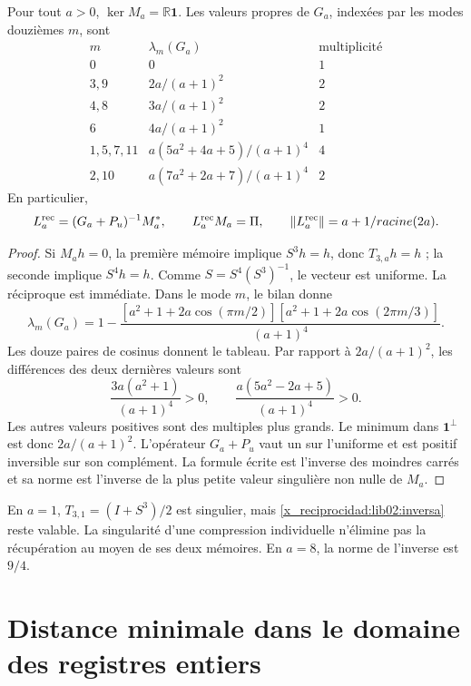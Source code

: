 \begin{theorem}
\label{x_reciprocidad:lib02:inversa-memorias}
Pour tout \(a>0\), \(\ker M_a=\mathbb R\mathbf1\). Les valeurs propres de \(G_a\), indexées par les modes douzièmes \(m\), sont
\[
\begin{array}{c|c|c}
 m&\lambda_m(G_a)&\text{multiplicité}\\\hline
 0&0&1\\
 3,9&2a/(a+1)^2&2\\
 4,8&3a/(a+1)^2&2\\
 6&4a/(a+1)^2&1\\
 1,5,7,11&a(5a^2+4a+5)/(a+1)^4&4\\
 2,10&a(7a^2+2a+7)/(a+1)^4&2
\end{array}
\]
En particulier,
\begin{equation}
 L_a^{\rm rec}=(G_a+P_u)^{-1}M_a^*,\qquad
 L_a^{\rm rec}M_a=\Pi,\qquad
 \|L_a^{\rm rec}\|=\frac{a+1}{\sqrt{2a}}.
 \label{x_reciprocidad:lib02:inversa}
\end{equation}
\end{theorem}
\begin{proof}
Si \(M_ah=0\), la première mémoire implique \(S^3h=h\), donc
\(T_{3,a}h=h\) ; la seconde implique \(S^4h=h\). Comme
\(S=S^4(S^3)^{-1}\), le vecteur est uniforme. La réciproque est
immédiate. Dans le mode \(m\), le bilan donne
\[
 \lambda_m(G_a)=1-
 \frac{[a^2+1+2a\cos(\pi m/2)]
 [a^2+1+2a\cos(2\pi m/3)]}{(a+1)^4}.
\]
Les douze paires de cosinus donnent le tableau. Par rapport à \(2a/(a+1)^2\), les différences des deux dernières valeurs sont
\[
 \frac{3a(a^2+1)}{(a+1)^4}>0,\qquad
 \frac{a(5a^2-2a+5)}{(a+1)^4}>0.
\]
Les autres valeurs positives sont des multiples plus grands. Le minimum
dans \(\mathbf1^\perp\) est donc \(2a/(a+1)^2\). L’opérateur
\(G_a+P_u\) vaut un sur l’uniforme et est positif inversible sur
son complément. La formule écrite est l’inverse des moindres carrés
et sa norme est l’inverse de la plus petite valeur singulière non nulle de \(M_a\).
\end{proof}

En \(a=1\), \(T_{3,1}=(I+S^3)/2\) est singulier, mais \eqref{x_reciprocidad:lib02:inversa} reste valable. La singularité d'une compression individuelle n'élimine pas la récupération au moyen de ses deux mémoires. En \(a=8\), la norme de l'inverse est \(9/4\).

\section{Distance minimale dans le domaine des registres entiers}
\label{x_reciprocidad:lib02:redes}


